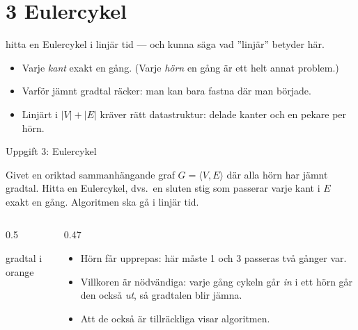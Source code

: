 \section{3 Eulercykel}

{hitta en Eulercykel i linjär tid — och kunna säga vad ”linjär” betyder här.}
{\begin{itemize}\setlength{\itemsep}{1pt}
  \item Varje \emph{kant} exakt en gång. (Varje \emph{hörn} en gång är ett helt annat problem.)
  \item Varför jämnt gradtal räcker: man kan bara fastna där man började.
  \item Linjärt i $|V|+|E|$ kräver rätt datastruktur: delade kanter och en pekare per hörn.
\end{itemize}}

\begin{frame}{Uppgift 3: Eulercykel}
\begin{infobox}
Givet en oriktad sammanhängande graf $G=\langle V,E\rangle$ där alla hörn har jämnt gradtal.
Hitta en Eulercykel, dvs.\ en sluten stig som passerar varje kant i $E$ exakt en gång.
Algoritmen ska gå i linjär tid.
\end{infobox}
\begin{columns}[T]
\begin{column}{0.5\textwidth}
\centering
\par
{\scriptsize\color{kthorange}gradtal i orange}
\end{column}
\begin{column}{0.47\textwidth}
\small
\begin{itemize}\setlength{\itemsep}{3pt}
  \item Hörn får upprepas: här måste 1 och 3 passeras två gånger var.
  \item Villkoren är nödvändiga: varje gång cykeln går \emph{in} i ett hörn går den också
        \emph{ut}, så gradtalen blir jämna.
  \item Att de också är tillräckliga visar algoritmen.
\end{itemize}
\end{column}
\end{columns}
\end{frame}

